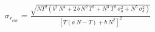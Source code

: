 


\begin{eqnarray*}
  \sigma_{r_{cor}} = \frac{\sqrt{N T^2 \left( b^2\, N^4 + 2\,b\,N^2\,T^2 + N^3\,T^2\,\sigma_a^2 + N^5\,\sigma_b^2 \right)}}{\left[ T \left( a \ N - T \right) + b \ N^2 \right] ^2}
\end{eqnarray*}

